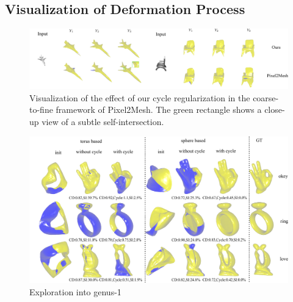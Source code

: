 \subsection{Visualization of Deformation Process}
\label{subsec:deform}
\begin{figure}
	\centering
	\includegraphics[width=\textwidth]{img/p2m/3level}
	\caption{Visualization of the effect of our cycle regularization in the coarse-to-fine framework of Pixel2Mesh. The green rectangle shows a close-up view of a subtle self-intersection.}
	\label{fig:3level}
\end{figure}
\begin{figure}[t]
	\centering
	\includegraphics[width=\linewidth]{revision/img/torus/torus}
	\caption{Exploration into genus-1}
	\label{fig:torus}
\end{figure}
